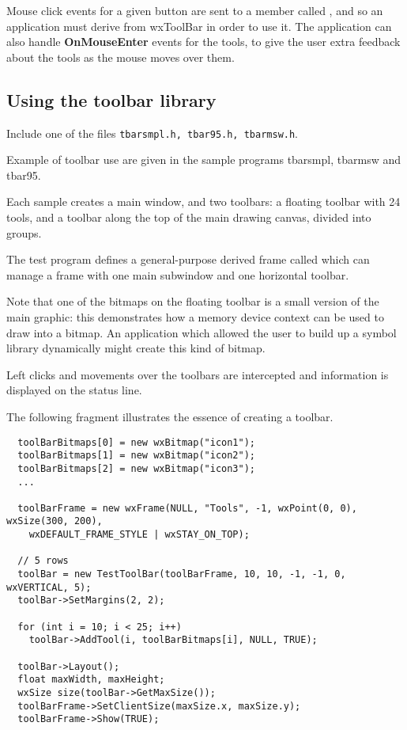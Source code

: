 Mouse click events for a given button are sent to a member called
, and so an application must derive from wxToolBar in order
to use it. The application can also handle {\bf OnMouseEnter} events for
the tools, to give the user extra feedback about the tools as the mouse
moves over them.

\subsection{Using the toolbar library}

Include one of the files {\tt tbarsmpl.h, tbar95.h, tbarmsw.h}.

Example of toolbar use are given in the sample programs tbarsmpl,
tbarmsw and tbar95.

Each sample creates a main window, and two toolbars: a floating toolbar
with 24 tools, and a toolbar along the top of the main drawing canvas, divided into groups.

The test program defines a general-purpose derived frame called
 which can manage a frame with one main subwindow
and one horizontal toolbar.

Note that one of the bitmaps on the floating toolbar is a small version of the
main graphic: this demonstrates how a memory device context can be used to
draw into a bitmap. An application which allowed the user to build up a symbol
library dynamically might create this kind of bitmap.

Left clicks and movements over the toolbars are intercepted and information
is displayed on the status line.

The following fragment illustrates the essence of creating a toolbar.

\begin{verbatim}
  toolBarBitmaps[0] = new wxBitmap("icon1");
  toolBarBitmaps[1] = new wxBitmap("icon2");
  toolBarBitmaps[2] = new wxBitmap("icon3");
  ...

  toolBarFrame = new wxFrame(NULL, "Tools", -1, wxPoint(0, 0), wxSize(300, 200),
    wxDEFAULT_FRAME_STYLE | wxSTAY_ON_TOP);

  // 5 rows
  toolBar = new TestToolBar(toolBarFrame, 10, 10, -1, -1, 0, wxVERTICAL, 5);
  toolBar->SetMargins(2, 2);

  for (int i = 10; i < 25; i++)
    toolBar->AddTool(i, toolBarBitmaps[i], NULL, TRUE);

  toolBar->Layout();
  float maxWidth, maxHeight;
  wxSize size(toolBar->GetMaxSize());
  toolBarFrame->SetClientSize(maxSize.x, maxSize.y);
  toolBarFrame->Show(TRUE);
\end{verbatim}


